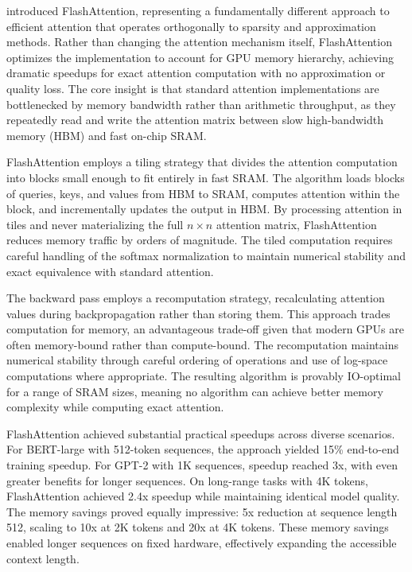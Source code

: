 \documentclass[11pt,letterpaper]{article}
\begin{document}
\cite{dao2022flashattention} introduced FlashAttention, representing a fundamentally different approach to efficient attention that operates orthogonally to sparsity and approximation methods. Rather than changing the attention mechanism itself, FlashAttention optimizes the implementation to account for GPU memory hierarchy, achieving dramatic speedups for exact attention computation with no approximation or quality loss. The core insight is that standard attention implementations are bottlenecked by memory bandwidth rather than arithmetic throughput, as they repeatedly read and write the attention matrix between slow high-bandwidth memory (HBM) and fast on-chip SRAM.

FlashAttention employs a tiling strategy that divides the attention computation into blocks small enough to fit entirely in fast SRAM. The algorithm loads blocks of queries, keys, and values from HBM to SRAM, computes attention within the block, and incrementally updates the output in HBM. By processing attention in tiles and never materializing the full $n \times n$ attention matrix, FlashAttention reduces memory traffic by orders of magnitude. The tiled computation requires careful handling of the softmax normalization to maintain numerical stability and exact equivalence with standard attention.

The backward pass employs a recomputation strategy, recalculating attention values during backpropagation rather than storing them. This approach trades computation for memory, an advantageous trade-off given that modern GPUs are often memory-bound rather than compute-bound. The recomputation maintains numerical stability through careful ordering of operations and use of log-space computations where appropriate. The resulting algorithm is provably IO-optimal for a range of SRAM sizes, meaning no algorithm can achieve better memory complexity while computing exact attention.

FlashAttention achieved substantial practical speedups across diverse scenarios. For BERT-large with 512-token sequences, the approach yielded 15\% end-to-end training speedup. For GPT-2 with 1K sequences, speedup reached 3x, with even greater benefits for longer sequences. On long-range tasks with 4K tokens, FlashAttention achieved 2.4x speedup while maintaining identical model quality. The memory savings proved equally impressive: 5x reduction at sequence length 512, scaling to 10x at 2K tokens and 20x at 4K tokens. These memory savings enabled longer sequences on fixed hardware, effectively expanding the accessible context length.
\end{document}
